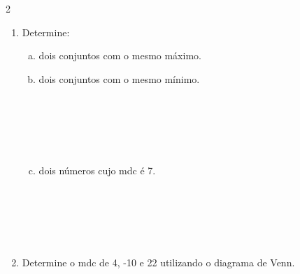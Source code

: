 \documentclass[a4paper,14pt]{article}
\begin{document}
\begin{multicols}{2}
\begin{enumerate}
\begin{enumerate}[a)]
				\item 6, 9 e 21. \\\\\\\\\\\\
				\item -12, 32 e 40. \\\\\\\\\\\\
			\end{enumerate}
			\item Determine:
			\begin{enumerate}[a)]
				\item dois conjuntos com o mesmo máximo. \newpage
				\item dois conjuntos com o mesmo mínimo. \\\\\\\\\\\\
				\item dois números cujo mdc é 7. \\\\\\\\\\\\
			\end{enumerate}
			\item Determine o mdc de 4, -10 e 22 utilizando o diagrama de Venn.
		\end{enumerate}

\end{multicols}
\end{document}
